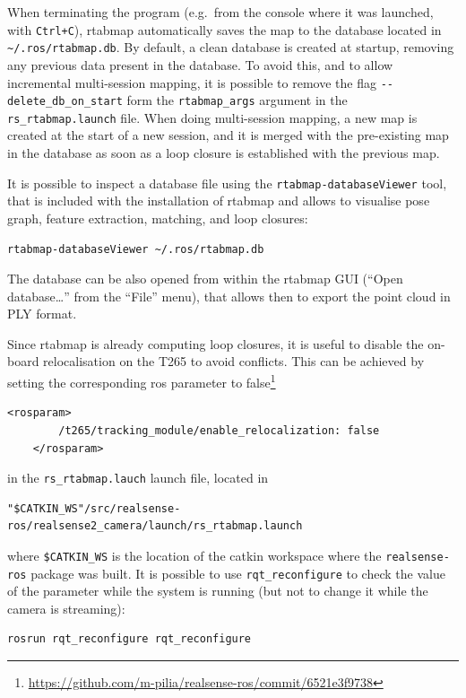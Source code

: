 \documentclass[11pt, letterpaper, twoside]{article}
\begin{document}
When terminating the program (e.g.\ from the console where it was launched, with
\texttt{Ctrl+C}), \gls{rtabmap} automatically saves the map to the database
located in \texttt{\textasciitilde/.ros/rtabmap.db}. By default, a clean database is created
at startup, removing any previous data present in the database. To avoid this,
and to allow incremental multi-session mapping, it is possible to remove the
flag \texttt{-{}-delete\_db\_on\_start} form the \texttt{rtabmap\_args} argument
in the \texttt{rs\_rtabmap.launch} file. When doing multi-session mapping, a
new map is created at the start of a new session, and it is merged with
the pre-existing map in the database as soon as a loop closure is established
with the previous map.

It is possible to inspect a database file using the
\texttt{rtabmap-databaseViewer} tool, that is included with the installation of
\gls{rtabmap} and allows to visualise pose graph, feature extraction, matching,
and loop closures:
\begin{Verbatim}[samepage=true]
    rtabmap-databaseViewer ~/.ros/rtabmap.db
\end{Verbatim}
The database can be also opened from within the \gls{rtabmap} GUI (``Open
database\ldots'' from the ``File'' menu), that allows then to export the point
cloud in PLY format.

Since \gls{rtabmap} is already computing loop closures, it is useful to disable
the on-board relocalisation on the T265 to avoid conflicts. This can be
achieved by setting the corresponding \gls{ros} parameter to
false\footnote{\url{https://github.com/m-pilia/realsense-ros/commit/6521e3f9738}}
\begin{Verbatim}[samepage=true]
    <rosparam>
        /t265/tracking_module/enable_relocalization: false
    </rosparam>
\end{Verbatim}
in the \texttt{rs\_rtabmap.lauch} launch file, located in
\begin{Verbatim}[samepage=true]
    "$CATKIN_WS"/src/realsense-ros/realsense2_camera/launch/rs_rtabmap.launch
\end{Verbatim}
where \texttt{\$CATKIN\_WS} is the location of the catkin workspace where the
\texttt{realsense-ros} package was built. It is possible to use
\texttt{rqt\_reconfigure} to check the value of the parameter while the system
is running (but not to change it while the camera is streaming):
\begin{Verbatim}[samepage=true]
    rosrun rqt_reconfigure rqt_reconfigure
\end{Verbatim}
\end{document}
